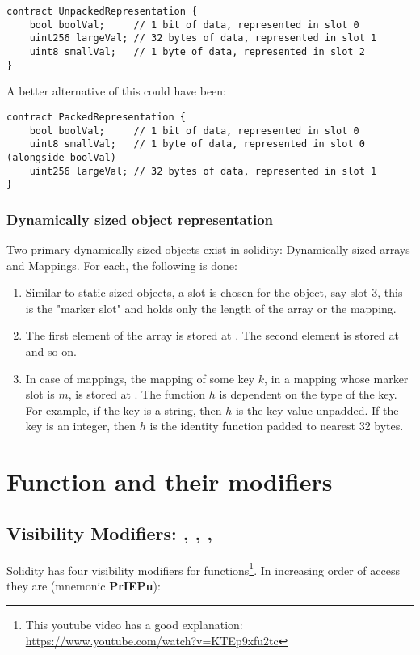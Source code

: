 \begin{lstlisting}[language=Solidity, caption=In-storage representation]
contract UnpackedRepresentation {
    bool boolVal;     // 1 bit of data, represented in slot 0
    uint256 largeVal; // 32 bytes of data, represented in slot 1
    uint8 smallVal;   // 1 byte of data, represented in slot 2
}
\end{lstlisting}

A better alternative of this could have been:
\begin{lstlisting}[language=Solidity, caption=In-storage representation(better)]
contract PackedRepresentation {
    bool boolVal;     // 1 bit of data, represented in slot 0
    uint8 smallVal;   // 1 byte of data, represented in slot 0 (alongside boolVal)
    uint256 largeVal; // 32 bytes of data, represented in slot 1
}
\end{lstlisting}

\subsubsection{Dynamically sized object representation}
Two primary dynamically sized objects exist in solidity: Dynamically sized arrays and Mappings. For each, the following is done:
\begin{enumerate}
    \item Similar to static sized objects, a slot is chosen for the object, say slot 3, this is the "marker slot" and holds only the length of the array or the mapping.
    \item The first element of the array is stored at . The second element is stored at  and so on.
    \item In case of mappings, the mapping of some key $k$, in a mapping whose marker slot is $m$, is stored at . The function $h$ is dependent on the type of the key. For example, if the key is a string, then $h$ is the key value unpadded. If the key is an integer, then $h$ is the identity function padded to nearest 32 bytes.
\end{enumerate}

\section{Function and their modifiers}

\subsection{Visibility Modifiers: , , , }
Solidity has four visibility modifiers for functions\footnote{This youtube video has a good explanation: \href{https://www.youtube.com/watch?v=KTEp9xfu2tc}{https://www.youtube.com/watch?v=KTEp9xfu2tc}}. In increasing order of access they are (mnemonic \textbf{PrIEPu}):

